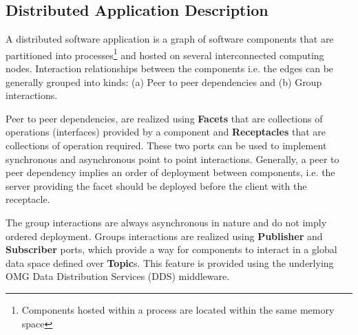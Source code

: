 





\subsection{Distributed Application Description}
\label{subsec:prob_desc}

A distributed software application is a graph of software components
that are partitioned into processes\footnote{Components hosted within
a process are located within the same memory space} and hosted on
several interconnected computing nodes. Interaction relationships
between the components i.e. the edges can be generally grouped into
kinds: (a) Peer to peer dependencies and (b) Group interactions.

Peer to peer dependencies, are realized using \textbf{Facets} that are
collections of operations (interfaces) provided by a component and
\textbf{Receptacles} that are collections of operation required.
These two ports can be used to implement synchronous and asynchronous
point to point interactions. Generally, a peer to peer dependency
implies an order of deployment between components, i.e. the server
providing the facet should be deployed before the client with the
receptacle.

The group interactions are always asynchronous in nature and do not
imply ordered deployment. Groups interactions are realized using
\textbf{Publisher} and \textbf{Subscriber} ports, which provide a way
for components to interact in a global data space defined over
\textbf{Topic}s.
This feature is provided using the underlying OMG Data Distribution
Services (DDS) middleware.


